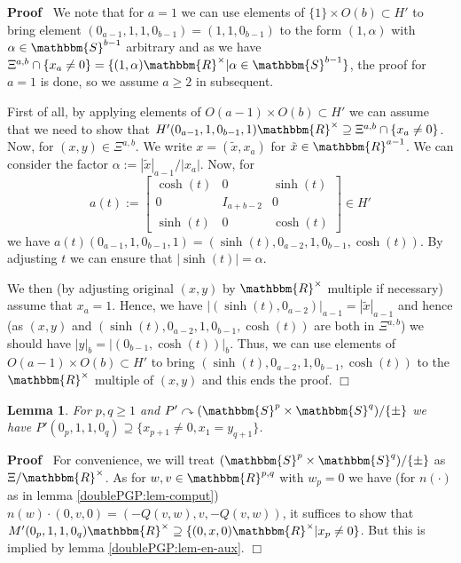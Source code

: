 \documentclass{article}
\newcommand{\assign}{:=}
\renewenvironment{proof}{\noindent\textbf{Proof\ }}{\hspace*{\fill}$\Box$\medskip}
\newtheorem{lemma}[proposition]{Lemma}
\theoremstyle{remark}
\begin{document}
\begin{proof}
  We note that for $a = 1$ we can use elements of $\{ 1 \} \times O (b)
  \subset H'$ to bring element $(0_{a - 1}, 1, 1, 0_{b - 1}) = (1, 1, 0_{b -
  1})$ to the form $(1, \alpha)$ with $\alpha \in \mathbbm{S}^{b - 1}$
  arbitrary and as we have $\Xi^{a, b} \cap \{ x_a \neq 0 \} = \{ (1, \alpha)
  \mathbbm{R}^{\times} | \alpha \in \mathbbm{S}^{b - 1} \}$, the proof for $a
  = 1$ is done, so we assume $a \geqslant 2$ in subsequent.
  
  First of all, by applying elements of $O (a - 1) \times O (b) \subset H'$ we
  can assume that we need to show that $H' (0_{a - 1}, 1, 0_{b - 1}, 1)
  \mathbbm{R}^{\times} \supseteq \Xi^{a, b} \cap \{ x_a \neq 0 \}$. Now, for
  $(x, y) \in \Xi^{a, b}$. We write $x = (\tilde{x}, x_a)$ for $\tilde{x} \in
  \mathbbm{R}^{a - 1}$. We can consider the factor $\alpha \assign | \tilde{x}
  |_{a - 1} / | x_a |$. Now, for
  \[ a (t) \assign \left[ \begin{array}{lll}
       \cosh (t) & 0 & \sinh (t)\\
       0 & I_{a + b - 2} & 0\\
       \sinh (t) & 0 & \cosh (t)
     \end{array} \right] \in H' \]
  we have $a (t) (0_{a - 1}, 1, 0_{b - 1}, 1) = (\sinh (t), 0_{a - 2}, 1, 0_{b
  - 1}, \cosh (t))$. By adjusting $t$ we can ensure that $| \sinh (t) | =
  \alpha$.
  
  We then (by adjusting original $(x, y)$ by $\mathbbm{R}^{\times}$ multiple
  if necessary) assume that $x_a = 1$. Hence, we have $| (\sinh (t), 0_{a -
  2}) |_{a - 1} = | \tilde{x} |_{a - 1}$ and hence (as $(x, y)$ and $(\sinh
  (t), 0_{a - 2}, 1, 0_{b - 1}, \cosh (t))$ are both in $\Xi^{a, b}$) we
  should have $| y |_b = | (0_{b - 1}, \cosh (t)) |_b$. Thus, we can use
  elements of $O (a - 1) \times O (b) \subset H'$ to bring $(\sinh (t), 0_{a -
  2}, 1, 0_{b - 1}, \cosh (t))$ to the $\mathbbm{R}^{\times}$ multiple of $(x,
  y)$ and this ends the proof.
\end{proof}

\begin{lemma}
  \label{doublePGP:lem-en}For $p, q \geqslant 1$ and $P' \curvearrowright
  (\mathbbm{S}^p \times \mathbbm{S}^q) / \{ \pm \}$ we have $P' (0_p, 1, 1,
  0_q) \supseteq \{ x_{p + 1} \neq 0, x_1 = y_{q + 1} \}$.
\end{lemma}

\begin{proof}
  For convenience, we will treat $(\mathbbm{S}^p \times \mathbbm{S}^q) / \{
  \pm \}$ as $\Xi /\mathbbm{R}^{\times}$. As for $w, v \in \mathbbm{R}^{p, q}$
  with $w_p = 0$ we have (for $n (\cdot)$ as in lemma
  \ref{doublePGP:lem-comput}) $n (w) \cdot (0, v, 0) = (- Q (v, w), v, - Q (v,
  w))$, it suffices to show that $M' (0_p, 1, 1, 0_q) \mathbbm{R}^{\times}
  \supseteq \{ (0, x, 0) \mathbbm{R}^{\times} | x_p \neq 0 \}$. But this is
  implied by lemma \ref{doublePGP:lem-en-aux}.
\end{proof}
\end{document}
